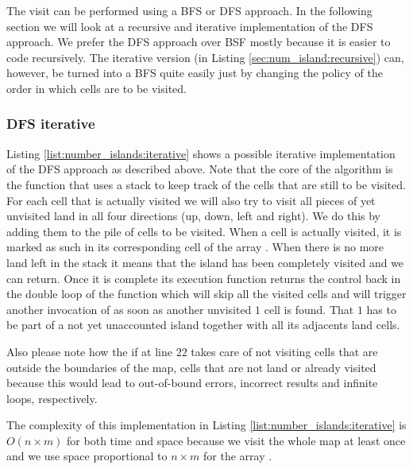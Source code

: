The visit can be performed using a BFS or DFS approach. In the following section we will look at a
recursive and iterative implementation of the DFS approach. We prefer the DFS approach over BSF mostly because it is easier to 
code recursively.
The iterative version (in Listing \ref{sec:num_island:recursive}) can, however,  be turned
into a BFS quite easily just  by changing the policy of the order in which cells are to be visited.


\subsubsection{DFS iterative}
\label{sec:num_island:iterative}
Listing \ref{list:number_islands:iterative} shows a possible iterative implementation of the DFS
approach as described above. Note that the core of the algorithm is the function  that
uses a stack to keep track of the cells that are still to be visited. For each cell that is actually
visited we will also try to visit all pieces of yet unvisited land in all four directions (up, down,
left and right). We do this by adding them to the pile of cells to be visited. When a cell is actually
visited, it is marked as such in its corresponding cell of the array .
When there is no  more land left in the stack it means that the island has been completely visited 
and we can return. Once it is complete its execution function 
returns the control back in the double loop of the function  which will skip all the
visited cells and will trigger another invocation of  as soon as another unvisited $1$ cell is
found. That $1$ has to be part of a not yet unaccounted island together with all its adjacents land cells.

Also please note how the if at line $22$ takes care of not visiting cells that are outside the
boundaries of the map, cells that are not land or already visited because this would lead to
out-of-bound errors, incorrect results and infinite loops, respectively.

The complexity of this implementation in Listing \ref{list:number_islands:iterative} is 
$O(n\times m)$ for both time and space 
because we visit the whole map at least once and we use space proportional to $n\times m$
for the array .



